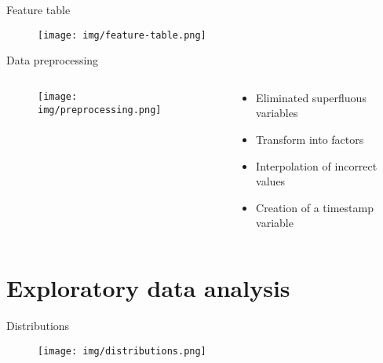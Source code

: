 \documentclass{minesbeamer}
\begin{document}
\begin{frame}{Feature table}
   \begin{figure}
        \centering
        \texttt{[image: img/feature-table.png]}
    \end{figure}
\end{frame}


\begin{frame}{Data preprocessing}
    \begin{columns}
        \begin{column}{0.6\textwidth}
            \begin{figure}
                \centering
                \texttt{[image: img/preprocessing.png]}
            \end{figure}
        \end{column}
        \begin{column}{0.4\textwidth}
            \begin{itemize}
                \item Eliminated superfluous variables
                \item Transform into factors
                \item Interpolation of incorrect values
                \item Creation of a timestamp variable
            \end{itemize}
        \end{column}
    \end{columns}
\end{frame}

\section{Exploratory data analysis}

\begin{frame}{Distributions}
    \begin{figure}
        \centering
        \texttt{[image: img/distributions.png]}
    \end{figure}
\end{frame}
\end{document}
